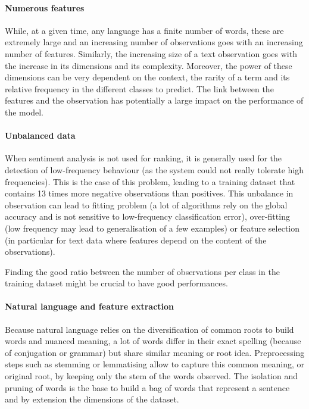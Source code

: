 \documentclass[a4paper, justified]{tufte-handout}
\begin{document}
\begin{fullwidth}
\paragraph{Numerous features}

While, at a given time, any language has a finite number of words, these are extremely large and an increasing number of observations goes with an increasing number of features. Similarly, the increasing size of a text observation goes with the increase in its dimensions and its complexity. Moreover, the power of these dimensions can be very dependent on the context, the rarity of a term and its relative frequency in the different classes to predict. The link between the features and the observation has potentially a large impact on the performance of the model.


\paragraph{Unbalanced data}

When sentiment analysis is not used for ranking, it is generally used for the detection of low-frequency behaviour (as the system could not really tolerate high frequencies). This is the case of this problem, leading to a training dataset that contains 13 times more negative observations than positives. This unbalance in observation can lead to fitting problem (a lot of algorithms rely on the global accuracy and is not sensitive to low-frequency classification error), over-fitting (low frequency may lead to generalisation of a few examples) or feature selection (in particular for text data where features depend on the content of the observations).

Finding the good ratio between the number of observations per class in the training dataset might be crucial to have good performances.

\paragraph{Natural language and feature extraction}

Because natural language relies on the diversification of common roots to build words and nuanced meaning, a lot of words differ in their exact spelling (because of conjugation or grammar) but share similar meaning or root idea. Preprocessing steps such as stemming or lemmatising allow to capture this common meaning, or original root, by keeping only the stem of the words observed. The isolation and pruning of words is the base to build a bag of words that represent a sentence and by extension the dimensions of the dataset.


\end{fullwidth}
\end{document}
